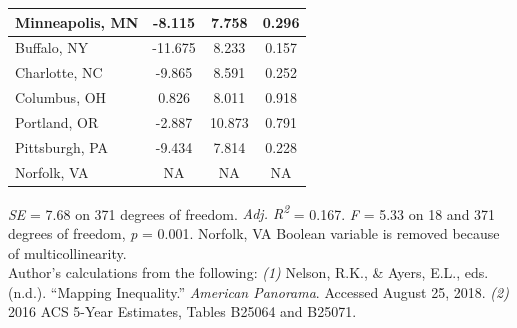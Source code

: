 \documentclass[paper=letter, fontsize=12pt]{scrartcl} %
\begin{document}
\begin{table}
\begin{center}
\begin{tabular}{|| l | c c c ||}
			\hline 
			Minneapolis, MN & 	-8.115	 & 	7.758	 & 	0.296	\\ 
			\hline 
			Buffalo, NY & 	-11.675	 & 	8.233	 & 	0.157	\\ 
			\hline 
			Charlotte, NC & 	-9.865	 & 	8.591	 & 	0.252	\\ 
			\hline 
			Columbus, OH & 	0.826	 & 	8.011	 & 	0.918	\\ 
			\hline 
			Portland, OR & 	-2.887	 & 	10.873	 & 	0.791	\\ 
			\hline 
			Pittsburgh, PA & 	-9.434	 & 	7.814	 & 	0.228	\\ 
			\hline 
			Norfolk, VA & 	NA	 & 	NA	 & 	NA	\\ 
			\hline 
		\end{tabular}
	\end{center}
\textit{SE} = 7.68 on 371 degrees of freedom. \textit{Adj. R\textsuperscript{2}} = 0.167. \textit{F} = 5.33 on 18 and 371 degrees of freedom, \textit{p} = 0.001. Norfolk, VA Boolean variable is removed because of multicollinearity.\\
Author's calculations from the following: \textit{(1)} Nelson, R.K., \& Ayers, E.L., eds. (n.d.). ``Mapping Inequality.'' \textit{American Panorama}. Accessed August 25, 2018. \textit{(2)} 2016 ACS 5-Year Estimates, Tables B25064 and B25071.
\end{table}
\end{document}
